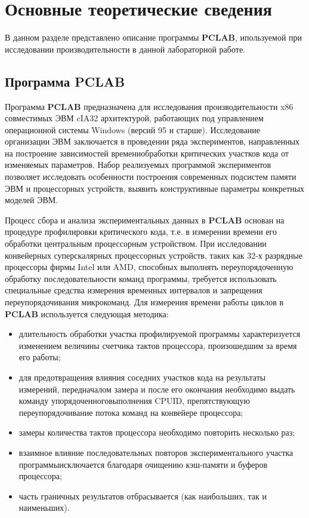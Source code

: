 \chapter{Основные теоретические сведения}

В данном разделе представлено описание программы \textbf{PCLAB}, ипользуемой
при исследовании производительности в данной лабораторной работе. 

\section{Программа  PCLAB}

Программа \textbf{PCLAB} предназначена  для исследования  производительности
x86 совместимых ЭВМ  cIA32 архитектурой, работающих под управлением
операционной системы Windows (версий 95 и старше). Исследование организации ЭВМ
заключается в проведении ряда экспериментов, направленных на построение
зависимостей  времениобработки критических участков кода от изменяемых
параметров. Набор реализуемых программой экспериментов позволяет исследовать
особенности построения современных подсистем памяти ЭВМ и процессорных
устройств, выявить конструктивные параметры конкретных моделей ЭВМ.

Процесс сбора и анализа экспериментальных данных в \textbf{PCLAB} основан на
процедуре профилировки критического кода, т.е. в измерении времени его
обработки центральным процессорным устройством. При исследовании конвейерных
суперскалярных процессорных устройств, таких как 32-х разрядные процессоры
фирмы Intel или AMD, способных выполнять переупорядоченную обработку
последовательности команд программы, требуется использовать специальные
средства измерения временных интервалов и запрещения переупорядочивания
микрокоманд. Для измерения времени работы циклов в \textbf{PCLAB} используется
следующая методика:
\begin{itemize}
    \item длительность   обработки   участка   профилируемой   программы
          характеризуется изменением величины счетчика тактов процессора,
          произошедшим за время его работы; 
    \item для предотвращения влияния соседних участков кода на результаты
          измерений, передначалом замера и после его окончания необходимо
          выдать команду упорядоченноговыполнения CPUID, препятствующую
          переупорядочивание потока команд на конвейере процессора;
    \item замеры количества тактов процессора необходимо повторить несколько
          раз;
    \item взаимное влияние последовательных повторов экспериментального участка
          программыисключается благодаря очищению кэш-памяти и буферов
          процессора;
    \item часть граничных результатов отбрасывается (как наибольших, так и
          наименьших).
\end{itemize}
